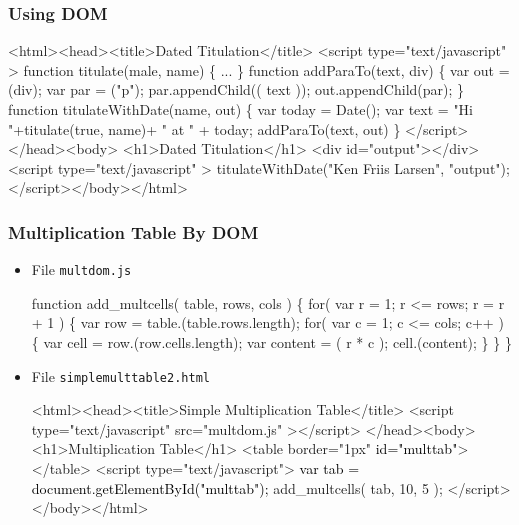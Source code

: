\documentclass[svgnames,handout]{beamer}
\begin{document}
\begin{frame}[fragile]  
\frametitle{Using DOM}
\begin{footnotesize}
\begin{semiverbatim}
<html><head><title>Dated Titulation</title>
<script type="text/javascript" >
function titulate(male, name) \{ ... \}
{function addParaTo(text, div) \{
   var out = (div);
   var par = ("p");
   par.appendChild(( text ));
   out.appendChild(par);
\}}
function titulateWithDate(name, out) \{
   var today = Date();
   var text = "Hi "+titulate(true, name)+ " at " + today;
   addParaTo(text, out)
\}
</script></head><body>
  <h1>Dated Titulation</h1>
<div id="output"></div>
<script type="text/javascript" >
titulateWithDate("Ken Friis Larsen", "output");
</script></body></html>
\end{semiverbatim}
\end{footnotesize}
\end{frame}



\begin{frame}[fragile] 
\frametitle{Multiplication Table By DOM}
  
\begin{itemize}
\item File \texttt{multdom.js}
  \begin{footnotesize}
\begin{semiverbatim}
function add_multcells( table, rows, cols ) \{
  for( var r = 1; r <= rows; r = r + 1 ) \{
    var row = table.(table.rows.length);
    for( var c = 1; c <= cols; c++ ) \{
      var cell = row.(row.cells.length);
      var content = ( r * c );
      cell.(content);
    \}
  \}
\}      
\end{semiverbatim}
  \end{footnotesize}
\item File \texttt{simplemulttable2.html}
\begin{footnotesize}
\begin{semiverbatim}
\color{gray}<html><head><title>Simple Multiplication Table</title>
<script type="text/javascript" src="multdom.js" ></script>
</head><body><h1>Multiplication Table</h1>
  <table border="1px" \textcolor{black}{id="multtab"}></table> 
  <script type="text/javascript">
    \textcolor{black}{var tab = document.getElementById("multtab");}
    add_multcells( tab, 10, 5 );
  </script></body></html>      
\end{semiverbatim}
  \end{footnotesize}
\end{itemize}
\end{frame}
\end{document}

